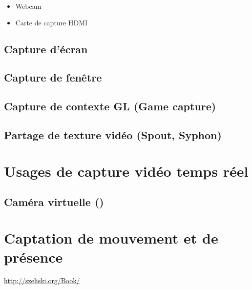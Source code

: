 \documentclass[
]{book}
\providecommand{\tightlist}{%
  \setlength{\itemsep}{0pt}\setlength{\parskip}{0pt}}
\begin{document}
\begin{itemize}
\tightlist
\item
  Webcam
\item
  Carte de capture HDMI
\end{itemize}

\hypertarget{capture-duxe9cran}{%
\subsection{Capture d'écran}\label{capture-duxe9cran}}

\hypertarget{capture-de-fenuxeatre}{%
\subsection{Capture de fenêtre}\label{capture-de-fenuxeatre}}

\hypertarget{capture-de-contexte-gl-game-capture}{%
\subsection{Capture de contexte GL (Game capture)}\label{capture-de-contexte-gl-game-capture}}

\hypertarget{partage-de-texture-viduxe9o-spout-syphon}{%
\subsection{Partage de texture vidéo (Spout, Syphon)}\label{partage-de-texture-viduxe9o-spout-syphon}}

\hypertarget{usages-de-capture-viduxe9o-temps-ruxe9el}{%
\section{Usages de capture vidéo temps réel}\label{usages-de-capture-viduxe9o-temps-ruxe9el}}

\hypertarget{camuxe9ra-virtuelle}{%
\subsection{Caméra virtuelle ()}\label{camuxe9ra-virtuelle}}

\hypertarget{captation-de-mouvement-et-de-pruxe9sence}{%
\section{Captation de mouvement et de présence}\label{captation-de-mouvement-et-de-pruxe9sence}}

\url{http://szeliski.org/Book/}
\end{document}
